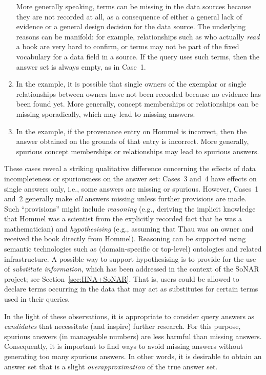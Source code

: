 \begin{enumerate}
    More generally speaking, terms can be missing in the data sources
    because they are not recorded at all, as a consequence of either a general lack of evidence
    or a general design decision for the data source. The underlying reasons can be manifold:
    for example, relationships such as who actually \emph{read} a book are very hard to confirm,
    or terms may not be part of the fixed vocabulary for a data field in a source.
    If the query uses such terms, then the answer set is always empty, as in Case~1.
  \item    
    In the example, it is possible that single owners of the exemplar or single relationships between owners
    have not been recorded because no evidence has been found yet.
    More generally, concept memberships or relationships can be missing sporadically,
    which may lead to missing answers.
  \item
    In the example, if the provenance entry on Hommel is incorrect, then the answer obtained on the grounds
    of that entry is incorrect.
    More generally, spurious concept memberships or relationships may lead to spurious answers.
\end{enumerate}
%
These cases reveal a striking qualitative difference concerning the effects of data incompleteness or spuriousness
on the answer set: Cases~3 and~4 have effects on single answers only, i.e., some answers are missing or spurious.
However, Cases~1 and~2 generally make \emph{all} answers missing unless further provisions are made.
Such \enquote{provisions} might include \emph{reasoning}
(e.g., deriving the implicit knowledge that Hommel was a scientist from the explicitly recorded fact that he was a mathematician)
and \emph{hypothesising} (e.g., assuming that Thau was an owner and received the book directly from Hommel).
Reasoning can be supported using semantic technologies such as (domain-specific or top-level) ontologies and related infrastructure.
A possible way to support hypothesising is to provide for the use of \emph{substitute information},
which has been addressed in the context of the \gls{SoNAR} project; see Section~\ref{sec:HNA+SoNAR}.
That is, users could be allowed to declare terms occurring in the data that may act as substitutes for certain terms used in their queries.

In the light of these observations,
it is appropriate to consider
query answers as \emph{candidates} that necessitate (and inspire) further research.
For this purpose, spurious answers (in manageable numbers) are less harmful than missing answers.
Consequently, it is important to find ways to avoid missing answers without generating too many spurious answers.
In other words, it is desirable to obtain an answer set that is a slight \emph{overapproximation}
of the true answer set.

